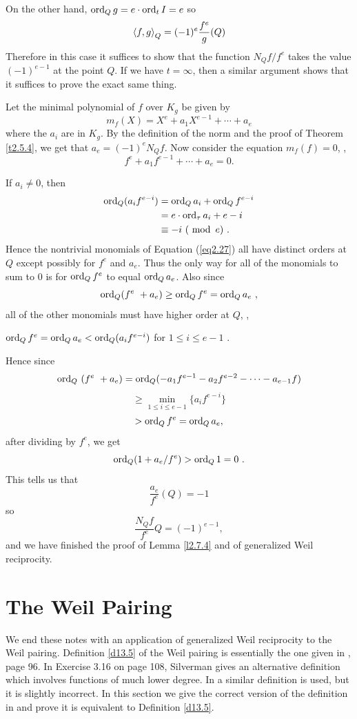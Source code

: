 On the other hand, $\operatorname{ord}_{Q}g=e\cdot \operatorname{ord}_{t}I =e$ so
\begin{equation}
\label{eq2.26}
\left\langle f,g \right \rangle_{Q}=(-1)^{e}\frac{f^{e}}{g}(Q)
\end{equation}
Therefore in this case it suffices to show that the function $N_{Q}f/f^{e}$ takes the value $(-1)^{e-1}$ at the point $Q$. If we have $t =\infty$, then a similar argument shows that it suffices to prove the exact same thing.

Let the minimal polynomial of $f$ over $K_{g}$ be given by
$$
m_{f}(X) = X^{e}+a_{1}X^{e-1}+\cdots + a_{e}
$$
where the $a_{i}$ are in $K_{g}$. By the definition of the norm and the proof of Theorem \ref{t2.5.4}, we get that $a_{e}=(-1)^{e}N_{Q}f$. Now consider the equation $m_{f}(f)=0$, \ie,
\begin{equation}
\label{eq2.27}
f^{e}+a_{1}f^{e-1}+\cdots+a_{e}=0 .
\end{equation}

If $a_{i}\neq 0$, then
\begin{align*}
\operatorname{ord}_{Q}(a_{i}f^{e-i})&=\operatorname{ord}_{Q}a_{i}+\operatorname{ord}_{Q}f^{e-i}\\
&=e\cdot \operatorname{ord}_{\tau}a_{i}+e-i\\
&\equiv-i\ (\ \operatorname{mod}\ e)\ .
\end{align*}
Hence the nontrivial monomials of Equation (\ref{eq2.27}) all have distinct orders at $Q$ except possibly for $f^{e}$ and $a_{e}$. Thus the only way for all of the monomials to sum to $0$ is for $\operatorname{ord}_{Q}f^{e}$ to equal $\operatorname{ord}_{Q}a_{e}$. Also since
$$
\operatorname{ord}_{Q}(f^{e}\ +a_{e}) \geq \operatorname{ord}_{Q}f^{e} = \operatorname{ord}_{Q} a_{e}\ ,
$$
all of the other monomials must have higher order at $Q$, \ie,
\begin{center}
$\operatorname{ord}_{Q}f^{e}=\operatorname{ord}_{Q}a_{e}<\operatorname{ord}_{Q}(a_{i}f^{e-i})$ for $1\leq i\leq e-1$ .
\end{center}
Hence since
$$
\operatorname{ord}_{Q}\ (f^{e}\ + a_{e})=\operatorname{ord}_{Q}(-a_{1}f^{e-1}-a_{2}f^{e-2}-\cdots-a_{e-1}f)
$$
$$
\geq\min_{1\leq i\leq e-1}\{a_{i}f^{e-i}\}
$$
$$
>\operatorname{ord}_{Q}f^{e}=\operatorname{ord}_{Q}a_{e},
$$
after dividing by $f^{e}$, we get
$$
\operatorname{ord}_{Q}(1+a_{e}/f^{e})>\operatorname{ord}_{Q}1=0\ .
$$
This tells us that
$$
\frac{a_{e}}{f^{e}}(Q)=-1
$$
so
$$
\frac{N_{Q}f}{f^{e}}Q=(-1)^{e-1},
$$
and we have finished the proof of Lemma \ref{l2.7.4} and of generalized Weil reciprocity.

\section{The Weil Pairing}

We end these notes with an application of generalized Weil reciprocity to the Weil pairing. Definition \ref{d13.5} of the Weil pairing is essentially the one given in \cite{r1.6}, page 96. In Exercise 3.16 on page 108, Silverman gives an alternative definition which involves functions of much lower degree. In \cite{r2.8} a similar definition is used, but it is slightly incorrect. In this section we give the correct version of the definition in \cite{r2.8} and prove it is equivalent to Definition \ref{d13.5}.

